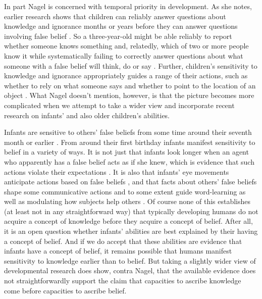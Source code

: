 \documentclass[11pt,a4paper]{extarticle}
\begin{document}
In part Nagel is concerned with temporal priority in development.
As she notes, earlier research shows that
children can reliably answer questions about knowledge and ignorance months or years before they can answer questions involving false belief \citep{hogrefe_ignorance_1986}.
So a three-year-old might be able reliably to report whether someone knows something and, relatedly, which of two or more people know it while systematically failing to correctly answer questions about what someone with a false belief will think, do or say \citep{Wellman:2001lz}.
Further, children's sensitivity to knowledge and ignorance appropriately guides a range of their actions, such as whether to rely on what someone says \citep{Robinson:1999sq,Robinson:2003bh} and whether to point to the location of an object \citep{Dunham:2000tv,Liszkowski:2008al}.
What Nagel doesn't mention, however, is that the picture becomes more complicated when we attempt to take a wider view and incorporate  recent research on infants' and also older children's abilities.

Infants are sensitive to others' false beliefs from some time around their seventh month or earlier \citep{kovacs_social_2010}.
From around their first birthday infants manifest sensitivity to belief in a variety of ways.
It is not just that infants look longer when an agent who apparently has a false belief acts as if she knew, which is evidence that such actions violate their expectations  \citep{Onishi:2005hm,Surian:2007hl}.
It is also that infants' eye movements anticipate actions based on false beliefs \citep{Southgate:2007js},
and that facts about others' false beliefs shape some communicative actions \citep{Knudsen:2011fk} and to some extent guide word-learning \citep{Carpenter:2002gc} as well as modulating how subjects help others \citep{Buttelmann:2009gy}.
Of course none of this establishes (at least not in any straightforward way) that typically developing humans do not acquire a concept of knowledge before they acquire a concept of belief.
After all, it is an open question whether infants' abilities are best explained by their having a concept of belief.
And if we do accept that these abilities are evidence that infants have a concept of belief, it remains possible that humans manifest sensitivity to knowledge earlier than to belief.
But taking a slightly wider view of developmental research does show, contra Nagel, that the available evidence does not  straightforwardly support the claim that capacities to ascribe knowledge come before  capacities to ascribe  belief.
\end{document}

